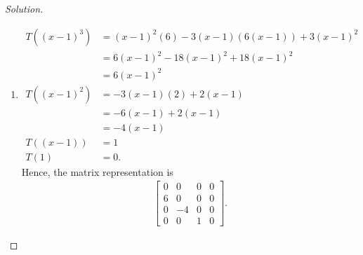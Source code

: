 \documentclass{article}
\begin{document}
\begin{proof}[Solution]
\begin{enumerate}[label=(\alph*)]
        \item 
        \begin{align*}
            T\left((x-1)^3\right) & = (x-1)^2(6) - 3(x-1)(6(x-1)) + 3(x-1)^2 \\
            & = 6(x-1)^2 - 18(x-1)^2 + 18(x-1)^2 \\
            & = 6(x-1)^2 \\
            T\left((x-1)^2\right) & = -3(x-1)(2) + 2(x-1) \\
            & = -6(x-1) + 2(x-1) \\
            & = -4(x-1) \\
            T\left((x-1)\right) & = 1 \\
            T\left(1\right) & = 0.
        \end{align*}
        Hence, the matrix representation is
        \begin{align*}
            \begin{bmatrix}
                0 & 0 & 0 & 0 \\
                6 & 0 & 0 & 0 \\
                0 & -4 & 0 & 0 \\
                0 & 0 & 1 & 0
            \end{bmatrix}.
        \end{align*}
    \end{enumerate}

    
\end{proof}

\newpage
\end{document}
